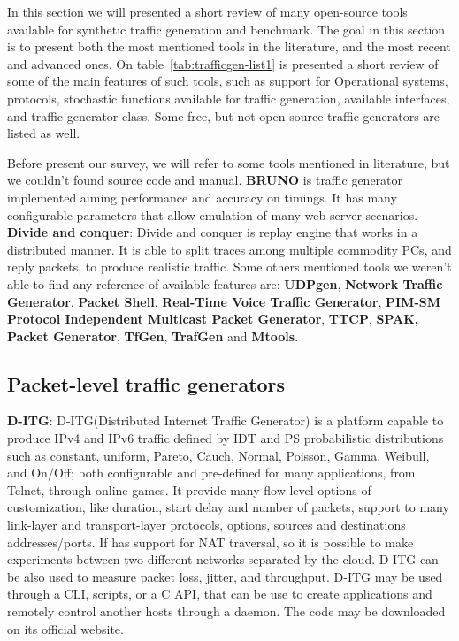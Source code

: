 In this section we will presented a short review of many open-source tools available for synthetic traffic generation and benchmark. The goal in this section is to present both the most mentioned tools in the literature, and the most recent and advanced ones. On table~\ref{tab:trafficgen-list1} is presented a short review of some of the main features of such tools, such as support for Operational systems, protocols, stochastic functions available for traffic generation, available interfaces, and traffic generator class. Some free, but not open-source traffic generators are listed as well. 

Before present our survey, we will refer to some tools mentioned in literature, but we couldn't found source code and manual. \textbf{BRUNO}\cite{bruno-paper} is traffic generator implemented aiming performance and accuracy on timings. It has many configurable parameters that allow emulation of many web server scenarios. \textbf{Divide and conquer}\cite{validate-trafficgen}: Divide and conquer is replay engine that works in a distributed manner. It is able to split traces among multiple commodity PCs, and reply packets, to produce realistic traffic. Some others mentioned tools\cite{web-ditg} we weren't able to find any reference of available features are: \textbf{UDPgen}, \textbf{Network Traffic Generator}, \textbf{Packet Shell}, \textbf{Real-Time Voice Traffic Generator}, \textbf{PIM-SM Protocol Independent Multicast Packet Generator}, \textbf{TTCP}, \textbf{SPAK, Packet Generator}, \textbf{TfGen}, \textbf{TrafGen} and \textbf{Mtools}.





\subsection{Packet-level traffic generators}


\textbf{D-ITG}\cite{ditg-paper}\cite{web-ditg}: D-ITG(Distributed Internet Traffic Generator) is a platform capable to produce IPv4 and IPv6 traffic defined by IDT and PS probabilistic distributions such as constant, uniform, Pareto, Cauch, Normal, Poisson, Gamma, Weibull, and On/Off; both configurable and pre-defined for many applications, from Telnet, through online games. It provide many flow-level options of customization, like duration, start delay and number of packets, support to many link-layer and transport-layer protocols, options, sources and destinations addresses/ports. If has support for NAT traversal, so it is possible to make experiments between two different networks separated by the cloud. D-ITG can be also used to measure packet loss, jitter, and throughput. D-ITG may be used through a CLI, scripts, or a C API, that can be use to create applications and remotely control another hosts through a daemon. The code may be downloaded on its official website. 


